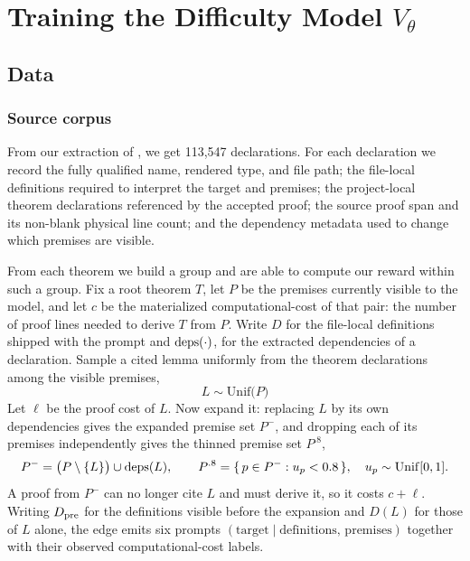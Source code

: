 \section{Training the Difficulty Model \texorpdfstring{$V_\theta$}{V-theta}}
\label{app:difficulty-model}

\subsection{Data}
\label{app:extraction}

\subsubsection{Source corpus}

From our extraction of \Mathlib, we get 113,547 declarations. For each declaration we record the fully qualified name, rendered type, and file path; the file-local definitions required to interpret the target and premises; the project-local theorem declarations referenced by the accepted proof; the source proof span and its non-blank physical line count; and the dependency metadata used to change which premises are visible.

From each theorem we build a group and are able to compute our reward within such a group. Fix a root theorem $T$, let
$P$ be the premises currently visible to the model, and let $c$ be the
materialized computational-cost of that pair: the number of proof lines needed
to derive $T$ from $P$. Write $D$ for the file-local definitions shipped with
the prompt and $\operatorname{deps}(\cdot)$, for the extracted dependencies of a declaration. Sample a cited lemma uniformly from the
theorem declarations among the visible premises,
\[
  L \sim \mathrm{Unif}\bigl(P)
\]
Let $\ell$ be the proof cost of $L$. Now expand it: replacing $L$ by its
own dependencies gives the expanded premise set $P^{-}$, and dropping each of
its premises independently gives the thinned premise set $P^{.8}$,
\[
  P^{-} = \bigl(P \setminus \{L\}\bigr) \cup \operatorname{deps}(L),
  \qquad
  P^{.8} = \{\, p \in P^{-} : u_p < 0.8 \,\},
  \quad u_p \sim \mathrm{Unif}[0,1].
\]
A proof from $P^{-}$ can no longer cite $L$ and must derive it, so it costs
$c+\ell$. Writing $D_{\rm pre}$ for the definitions visible before the
expansion and $D(L)$ for those of $L$ alone, the edge emits six prompts
$(\text{target}\mid\text{definitions},\,\text{premises})$ together with their
observed computational-cost labels.

